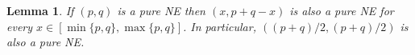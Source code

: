 \documentclass[11pt,a4paper]{article}
\newcommand{\qed}{\rule{1.5mm}{2mm}\vspace{0.1in}}
\newenvironment{proof}{\par\noindent{\bf Proof:}}{\qed}
\newtheorem{lemma}[theorem]{Lemma}
\begin{document}
\begin{lemma}
	\label{obs:total-price-convex}
If $(p,q)$ is a pure NE then $(x, p+q-x)$ is also a pure NE for every
$x\in [\min \{p,q\}, \max \{p,q\}]$.
	In particular, $((p+q)/2, (p+q)/2)$ is also a pure NE.
\end{lemma}
%	
%	
%	
%	
	
\end{document}
